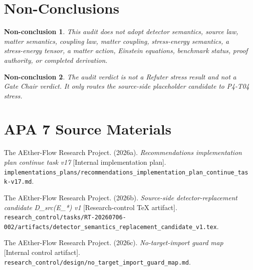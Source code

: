 \documentclass[11pt]{article}
\newtheorem{nonconclusion}{Non-conclusion}
\begin{document}
\section{Non-Conclusions}

\begin{nonconclusion}
This audit does not adopt detector semantics, source law, matter semantics,
coupling law, matter coupling, stress-energy semantics, a stress-energy
tensor, a matter action, Einstein equations, benchmark status, proof
authority, or completed derivation.
\end{nonconclusion}

\begin{nonconclusion}
The audit verdict is not a Refuter stress result and not a Gate Chair verdict.
It only routes the source-side placeholder candidate to P4-T04 stress.
\end{nonconclusion}

\section{APA 7 Source Materials}

The AEther-Flow Research Project. (2026a). \emph{Recommendations
implementation plan continue task v17} [Internal implementation plan].
\texttt{implementations\_plans/recommendations\_implementation\_plan\_continue\_task-v17.md}.

The AEther-Flow Research Project. (2026b). \emph{Source-side
detector-replacement candidate D\_src(E\_*) v1} [Research-control TeX
artifact].
\texttt{research\_control/tasks/RT-20260706-002/artifacts/detector\_semantics\_replacement\_candidate\_v1.tex}.

The AEther-Flow Research Project. (2026c). \emph{No-target-import guard map}
[Internal control artifact].
\texttt{research\_control/design/no\_target\_import\_guard\_map.md}.
\end{document}
